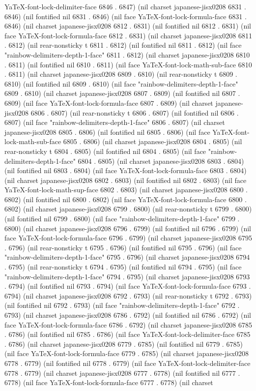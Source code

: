 YaTeX-font-lock-delimiter-face 6846 . 6847) (nil charset japanese-jisx0208 6831 . 6846) (nil fontified nil 6831 . 6846) (nil face YaTeX-font-lock-formula-face 6831 . 6846) (nil charset japanese-jisx0208 6812 . 6831) (nil fontified nil 6812 . 6831) (nil face YaTeX-font-lock-formula-face 6812 . 6831) (nil charset japanese-jisx0208 6811 . 6812) (nil rear-nonsticky t 6811 . 6812) (nil fontified nil 6811 . 6812) (nil face "rainbow-delimiters-depth-1-face" 6811 . 6812) (nil charset japanese-jisx0208 6810 . 6811) (nil fontified nil 6810 . 6811) (nil face YaTeX-font-lock-math-sub-face 6810 . 6811) (nil charset japanese-jisx0208 6809 . 6810) (nil rear-nonsticky t 6809 . 6810) (nil fontified nil 6809 . 6810) (nil face "rainbow-delimiters-depth-1-face" 6809 . 6810) (nil charset japanese-jisx0208 6807 . 6809) (nil fontified nil 6807 . 6809) (nil face YaTeX-font-lock-formula-face 6807 . 6809) (nil charset japanese-jisx0208 6806 . 6807) (nil rear-nonsticky t 6806 . 6807) (nil fontified nil 6806 . 6807) (nil face "rainbow-delimiters-depth-1-face" 6806 . 6807) (nil charset japanese-jisx0208 6805 . 6806) (nil fontified nil 6805 . 6806) (nil face YaTeX-font-lock-math-sub-face 6805 . 6806) (nil charset japanese-jisx0208 6804 . 6805) (nil rear-nonsticky t 6804 . 6805) (nil fontified nil 6804 . 6805) (nil face "rainbow-delimiters-depth-1-face" 6804 . 6805) (nil charset japanese-jisx0208 6803 . 6804) (nil fontified nil 6803 . 6804) (nil face YaTeX-font-lock-formula-face 6803 . 6804) (nil charset japanese-jisx0208 6802 . 6803) (nil fontified nil 6802 . 6803) (nil face YaTeX-font-lock-math-sup-face 6802 . 6803) (nil charset japanese-jisx0208 6800 . 6802) (nil fontified nil 6800 . 6802) (nil face YaTeX-font-lock-formula-face 6800 . 6802) (nil charset japanese-jisx0208 6799 . 6800) (nil rear-nonsticky t 6799 . 6800) (nil fontified nil 6799 . 6800) (nil face "rainbow-delimiters-depth-1-face" 6799 . 6800) (nil charset japanese-jisx0208 6796 . 6799) (nil fontified nil 6796 . 6799) (nil face YaTeX-font-lock-formula-face 6796 . 6799) (nil charset japanese-jisx0208 6795 . 6796) (nil rear-nonsticky t 6795 . 6796) (nil fontified nil 6795 . 6796) (nil face "rainbow-delimiters-depth-1-face" 6795 . 6796) (nil charset japanese-jisx0208 6794 . 6795) (nil rear-nonsticky t 6794 . 6795) (nil fontified nil 6794 . 6795) (nil face "rainbow-delimiters-depth-1-face" 6794 . 6795) (nil charset japanese-jisx0208 6793 . 6794) (nil fontified nil 6793 . 6794) (nil face YaTeX-font-lock-formula-face 6793 . 6794) (nil charset japanese-jisx0208 6792 . 6793) (nil rear-nonsticky t 6792 . 6793) (nil fontified nil 6792 . 6793) (nil face "rainbow-delimiters-depth-1-face" 6792 . 6793) (nil charset japanese-jisx0208 6786 . 6792) (nil fontified nil 6786 . 6792) (nil face YaTeX-font-lock-formula-face 6786 . 6792) (nil charset japanese-jisx0208 6785 . 6786) (nil fontified nil 6785 . 6786) (nil face YaTeX-font-lock-delimiter-face 6785 . 6786) (nil charset japanese-jisx0208 6779 . 6785) (nil fontified nil 6779 . 6785) (nil face YaTeX-font-lock-formula-face 6779 . 6785) (nil charset japanese-jisx0208 6778 . 6779) (nil fontified nil 6778 . 6779) (nil face YaTeX-font-lock-delimiter-face 6778 . 6779) (nil charset japanese-jisx0208 6777 . 6778) (nil fontified nil 6777 . 6778) (nil face YaTeX-font-lock-formula-face 6777 . 6778) (nil charset 